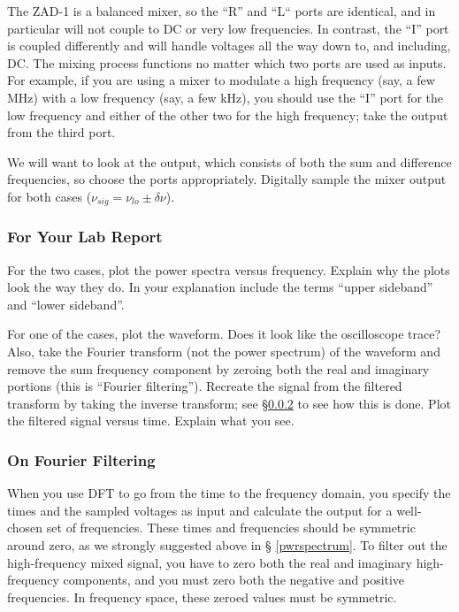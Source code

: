 \documentclass[11pt]{article}
\begin{document}
        The ZAD-1 is a balanced mixer, so the ``R'' and ``L`` ports are
identical, and in particular will not couple to DC or very low
frequencies.  In contrast, the ``I'' port is coupled differently and
will handle voltages all the way down to, and including, DC.  The mixing
process functions no matter which two ports are used as inputs.  For
example, if you are using a mixer to modulate a high frequency (say, a
few MHz) with a low frequency (say, a few kHz), you should use the ``I''
port for the low frequency and either of the other two for the high
frequency; take the output from the third port.

We will want to look at the output, which consists of both the sum
and difference frequencies, so choose the ports appropriately. Digitally
sample the mixer output for both cases ($\nu_{sig} = \nu_{lo} \pm \delta
\nu$).

\subsubsection{For Your Lab Report} \label{digsamp}

        For the two cases, plot the power spectra versus
frequency. Explain why the plots look the way they do. In your
explanation include the terms ``upper sideband'' and ``lower sideband''.

For one of the cases, plot the waveform.  Does it look like the
oscilloscope trace? Also, take the Fourier transform (not the power
spectrum) of the waveform and remove the sum frequency component by
zeroing both the real and imaginary portions (this is ``Fourier
filtering'').  Recreate the signal from the filtered transform by taking
the inverse transform; see \S \ref{fourierfilter} to see how this is
done. Plot the filtered signal versus time.  Explain what you see.

\subsubsection {On  Fourier Filtering} \label{fourierfilter}

When you use DFT to go from the time to the frequency domain, you
specify the times and the sampled voltages as input and calculate the
output for a well-chosen set of frequencies.  These times and
frequencies should be symmetric around zero, as we strongly suggested above in \S
\ref{pwrspectrum}.  To filter out the high-frequency mixed signal, you
have to zero both the real and imaginary high-frequency components,
and you must zero both the negative and positive frequencies. In
frequency space, these zeroed values must be symmetric.
\end{document}
